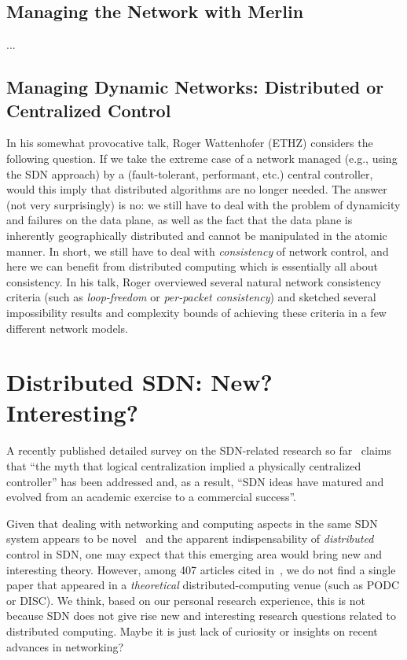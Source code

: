 \documentclass[11pt,pdftex,letter]{article}
\begin{document}
\subsection{Managing the Network with Merlin}

...

\subsection{Managing Dynamic Networks: Distributed or Centralized
  Control}

In his somewhat provocative talk, Roger Wattenhofer (ETHZ) considers
the following question. If we take the extreme case of a network 
managed (e.g., using the SDN approach) by a (fault-tolerant,
performant, etc.) central controller, would this imply
that distributed algorithms are no longer needed. The answer (not very
surprisingly) is no: we still have to deal with the problem of
dynamicity and failures on the data plane, as well as the fact that
the data plane is inherently geographically distributed and cannot be
manipulated in the atomic manner. In short, we still have to deal with
\emph{consistency} of network control, and here we can benefit from
distributed computing which is essentially all about consistency. 
In his talk, Roger overviewed several natural network consistency
criteria (such as \emph{loop-freedom} or \emph{per-packet
  consistency}) and sketched several impossibility results and
complexity bounds of achieving these criteria in a few different
network models.   


\section{Distributed SDN: New? Interesting?}

A recently published detailed survey on the 
SDN-related research so far~\cite{sdn-survey} 
claims that ``the myth that logical centralization implied
a physically centralized controller'' has been addressed and, as a
result, ``SDN ideas have matured and evolved from
an academic exercise to a commercial success''. 

Given that dealing with networking and computing aspects in the
same SDN system appears to be novel~\cite{roger-hotnets,stn-tr,stn} and
the apparent indispensability of \emph{distributed} control in SDN,
one may expect that this emerging area would bring new and interesting theory.   
However, among 407 articles cited in~\cite{sdn-survey}, we do not find
a single paper that appeared in a \emph{theoretical} distributed-computing venue
(such as PODC or DISC).
We think, based on our personal research experience, this is not
because SDN does not give rise new and interesting
research questions related to distributed computing. 
Maybe it is just lack of curiosity or insights on recent
advances in networking?  
 
\end{document}

